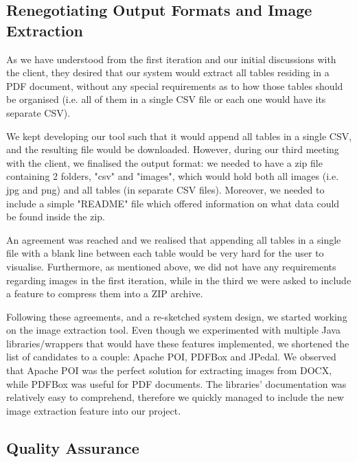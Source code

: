 \documentclass{l3proj}
\begin{document}
\subsection{Renegotiating Output Formats and Image Extraction}
\label{sec:renego_client}
As we have understood from the first iteration and our initial discussions with the client, they desired that our system would extract all tables residing in a PDF document, without any special requirements as to how those tables should be organised (i.e. all of them in a single CSV file or each one would have its separate CSV).

We kept developing our tool such that it would append all tables in a single CSV, and the resulting file would be downloaded. However, during our third meeting with the client, we finalised the output format: we needed to have a zip file containing 2 folders, "csv" and "images", which would hold both all images (i.e. jpg and png) and all tables (in separate CSV files). Moreover, we needed to include a simple "README" file which offered information on what data could be found inside the zip.

An agreement was reached and we realised that appending all tables in a single file with a blank line between each table would be very hard for the user to visualise. Furthermore, as mentioned above, we did not have any requirements regarding images in the first iteration, while in the third we were asked to include a feature to compress them into a ZIP archive.

Following these agreements, and a re-sketched system design, we started working on the image extraction tool. Even though we experimented with multiple Java libraries/wrappers that would have these features implemented, we shortened the list of candidates to a couple: Apache POI, PDFBox and JPedal. We observed that Apache POI was the perfect solution for extracting images from DOCX, while PDFBox was useful for PDF documents. The libraries' documentation was relatively easy to comprehend, therefore we quickly managed to include the new image extraction feature into our project.

\subsection{Quality Assurance}
\label{sec:quality_ass}
\end{document}
